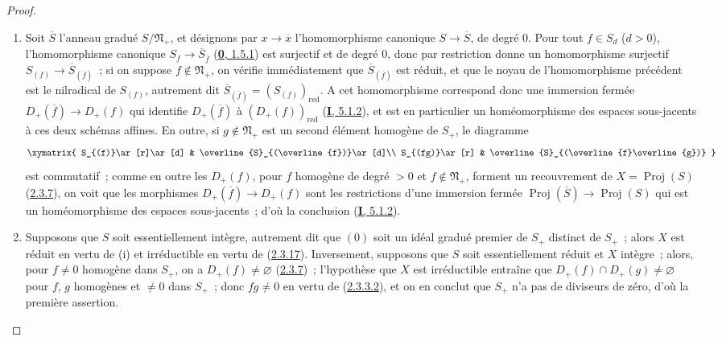 \begin{proof}
\begin{enumerate}
  \item[\rm(i)] Soit $\overline{S}$ l'anneau gradué
    $S/\mathfrak{N}_+$, et désignons par $x\to\overline{x}$
    l'homomorphisme canonique $S\to\overline{S}$, de degré $0$. Pour tout
    $f\in S_d$ ($d>0$), l'homomorphisme canonique
    $S_f\to\overline{S}_{\overline{f}}$
    (\hyperref[0.1.5.1-fr]{\textbf{0}, 1.5.1}) est surjectif et de degré $0$, donc
    par restriction donne un homomorphisme surjectif
    $S_{(f)}\to\overline{S}_{(\overline{f})}$~; si on suppose
    $f\notin\mathfrak{N}_+$, on vérifie immédiatement que
    $\overline{S}_{(\overline{f})}$ est réduit, et que le noyau de
    l'homomorphisme précédent est le nilradical de $S_{(f)}$, autrement dit
    $\overline{S}_{(\overline{f})}=(S_{(f)})_{\mathrm{red}}$. A cet
    homomorphisme correspond donc une immersion fermée
    $D_+(\overline{f})\to D_+(f)$ qui identifie $D_+(\overline{f})$ à
    $(D_+(f))_{\mathrm{red}}$ (\hyperref[I.5.1.2-fr]{\textbf{I}, 5.1.2}), et est en
    particulier un homéomorphisme des espaces sous-jacents à ces deux
    schémas affines. En outre, si $g\notin\mathfrak{N}_+$ est un second
    élément homogène de $S_+$, le diagramme
    \[
      \xymatrix{
        S_{(f)}\ar[r]\ar[d]
        & \overline{S}_{(\overline{f})}\ar[d]\\
        S_{(fg)}\ar[r]
        & \overline{S}_{(\overline{f}\overline{g})}
      }
    \]
    est commutatif~; comme en outre les $D_+(f)$, pour $f$ homogène de
    degré $>0$ et $f\notin\mathfrak{N}_+$, forment un recouvrement de
    $X=\operatorname{Proj}(S)$ (\hyperref[II.2.3.7-fr]{2.3.7}), on voit
    que les morphismes $D_+(\overline{f})\to D_+(f)$ sont les restrictions
    d'une immersion fermée
    $\operatorname{Proj}(\overline{S})\to\operatorname{Proj}(S)$ qui est
    un homéomorphisme des espaces sous-jacents~; d'où la conclusion
    (\hyperref[I.5.1.2-fr]{\textbf{I}, 5.1.2}).
  \item[\rm(ii)] Supposons que $S$ soit essentiellement intègre, autrement
    dit que $(0)$ soit un idéal gradué premier de $S_+$ distinct de $S_+$~;
    alors $X$ est réduit en vertu de (i) et irréductible en vertu de
    (\hyperref[II.2.3.17-fr]{2.3.17}). Inversement, supposons que $S$ soit
    essentiellement réduit et $X$ intègre~; alors, pour $f\neq0$ homogène
    dans $S_+$, on a $D_+(f)\neq\varnothing$
    (\hyperref[II.2.3.7-fr]{2.3.7})~; l'hypothèse que $X$ est irréductible
    entraîne que $D_+(f)\cap D_+(g)\neq\varnothing$ pour $f$, $g$
    homogènes et $\neq0$ dans $S_+$~; donc $fg\neq0$ en vertu de
    (\hyperref[II.2.3.3.2-fr]{2.3.3.2}), et on en conclut que $S_+$ n'a pas
    de diviseurs de zéro, d'où la première assertion.
\end{enumerate}
\end{proof}

